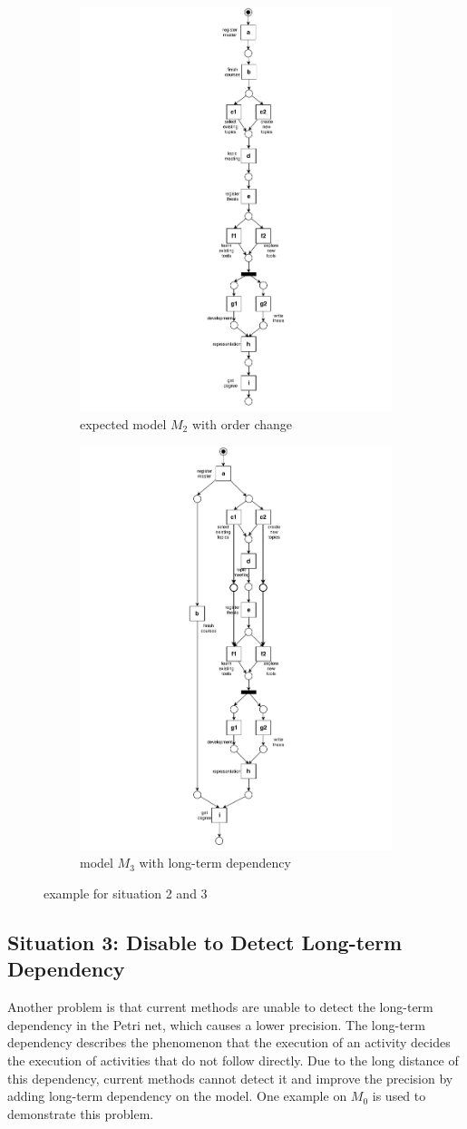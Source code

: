 \begin{figure}[htp]
	\centering
	\begin{subfigure}[b]{0.5\textwidth}
		\centering
		\includegraphics[clip, trim=8cm 0cm 8cm 0cm, width=0.5\linewidth, height=0.7\textheight]{figures/introduction/Master-change-order.pdf}
		\caption{expected model $M_{2}$ with order change}
		\label{fig:model_c}
	\end{subfigure}%
	\begin{subfigure}[b]{0.5\textwidth}
		\centering
		\includegraphics[clip, trim=7cm 0cm 7cm 0cm, width=0.5\linewidth, height=0.7\textheight]{figures/introduction/Master-with-lt.pdf}
		\caption{model $M_{3}$ with long-term dependency}
		\label{fig:model_d}
	\end{subfigure}
	\caption{example for situation 2 and 3}
	\label{fig:model_changes_2_3}
\end{figure}
\subsection{Situation 3: \small{Disable to Detect Long-term Dependency}}
Another problem is that current methods are unable to detect the long-term dependency in the Petri net, which causes a lower precision. The long-term dependency describes the phenomenon that the execution of an activity decides the execution of activities that do not follow directly. Due to the long distance of this dependency, current methods cannot detect it and improve the precision by adding long-term dependency on the model. One example  on $M_0$ is used to demonstrate this problem.
 

